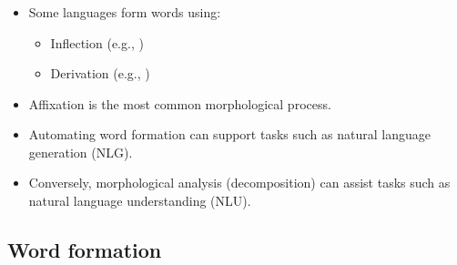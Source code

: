 \documentclass[xcolor=table]{beamer}
\begin{document}
\begin{frame}
	\frametitle{\insertshortsubtitle}
	\framesubtitle{\insertsection}

	\begin{itemize}
		\item Some languages form words using:
		\begin{itemize}
			\item Inflection (e.g., )
			\item Derivation (e.g., )
		\end{itemize}
		
		\item Affixation is the most common morphological process.
		
		\item Automating word formation can support tasks such as natural language generation (NLG).
		
		\item Conversely, morphological analysis (decomposition) can assist tasks such as natural language understanding (NLU).
	\end{itemize}

\end{frame}

\subsection{Word formation}
\end{document}
